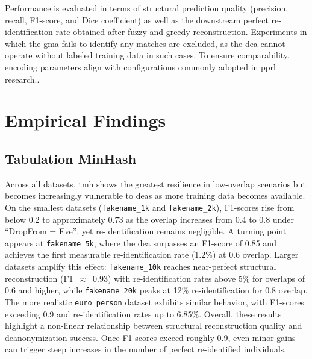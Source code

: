 \documentclass[a4paper,11pt]{scrartcl}
\begin{document}
Performance is evaluated in terms of structural prediction quality (precision, recall, F1-score, and Dice coefficient) as well as the downstream perfect re-identification rate obtained after fuzzy and greedy reconstruction. 
Experiments in which the \ac{gma} fails to identify any matches are excluded, as the \ac{dea} cannot operate without labeled training data in such cases.
To ensure comparability, encoding parameters align with configurations commonly adopted in \ac{pprl} research..

\section{Empirical Findings}

\subsection{Tabulation MinHash}

Across all datasets, \ac{tmh} shows the greatest resilience in low-overlap scenarios but becomes increasingly vulnerable to \ac{dea}s as more training data becomes available. 
On the smallest datasets (\texttt{fakename\_1k} and \texttt{fakename\_2k}), F1-scores rise from below 0.2 to approximately 0.73 as the overlap increases from 0.4 to 0.8 under ``DropFrom = Eve'', yet re-identification remains negligible. 
A turning point appears at \texttt{fakename\_5k}, where the \ac{dea} surpasses an F1-score of 0.85 and achieves the first measurable re-identification rate (1.2\%) at 0.6 overlap. 
Larger datasets amplify this effect: \texttt{fakename\_10k} reaches near-perfect structural reconstruction (F1~$\approx$~0.93) with re-identification rates above 5\% for overlaps of 0.6 and higher, while \texttt{fakename\_20k} peaks at 12\% re-identification for 0.8 overlap. 
The more realistic \texttt{euro\_person} dataset exhibits similar behavior, with F1-scores exceeding 0.9 and re-identification rates up to 6.85\%. 
Overall, these results highlight a non-linear relationship between structural reconstruction quality and deanonymization success. 
Once F1-scores exceed roughly 0.9, even minor gains can trigger steep increases in the number of perfect re-identified individuals.
\end{document}
